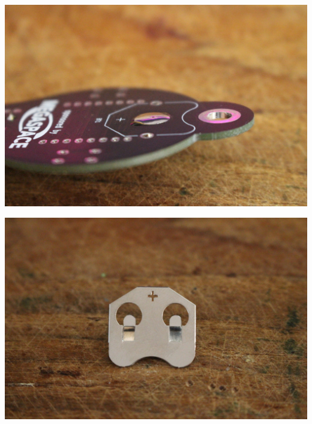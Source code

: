 \documentclass{article}
\begin{document}
\begin{minipage}[b]{0.5\textwidth}
	\includegraphics[width=\textwidth]{Bilder2022/IMG_8207.JPG}
\end{minipage}
\begin{minipage}[b]{0.5\textwidth}
	\includegraphics[width=\textwidth]{Bilder2022/IMG_8208.JPG}
\end{minipage}

\vspace{0.5cm}
\end{document}

